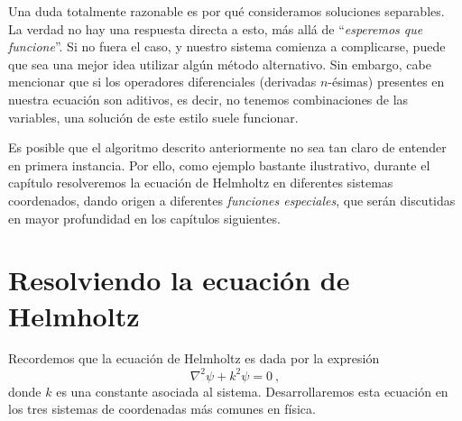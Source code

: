 Una duda totalmente razonable es por qué consideramos soluciones separables. La verdad no hay una respuesta directa a esto, más allá de ``\emph{esperemos que funcione}''. Si no fuera el caso, y nuestro sistema comienza a complicarse, puede que sea una mejor idea utilizar algún método alternativo. Sin embargo, cabe mencionar que si los operadores diferenciales (derivadas $n$-ésimas) presentes en nuestra ecuación son aditivos, es decir, no tenemos combinaciones de las variables, una solución de este estilo suele funcionar.








Es posible que el algoritmo descrito anteriormente no sea tan claro de entender en primera instancia. Por ello, como ejemplo bastante ilustrativo, durante el capítulo resolveremos la ecuación de Helm\-holtz en diferentes sistemas coordenados, dando origen a diferentes \emph{funciones especiales}, que serán discutidas en mayor profundidad en los capítulos siguientes.

\section{Resolviendo la ecuación de Helmholtz}

Recordemos que la ecuación de Helmholtz es dada por la expresión
\begin{equation}\label{eq:Helmholtz}
    \nabla^2 \psi + k^2 \psi = 0 \ ,
\end{equation}
donde $k$ es una constante asociada al sistema. Desarrollaremos esta ecuación en los tres sistemas de coordenadas más comunes en física.

